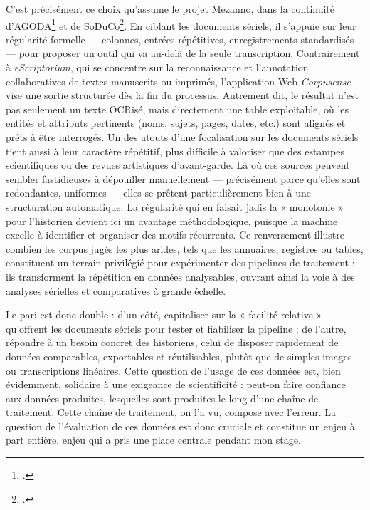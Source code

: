 C’est précisément ce choix qu’assume le projet Mezanno, dans la continuité d’AGODA\footcite[][]{fanny} et de SoDuCo\footcite[][]{soduco}. En ciblant les documents sériels, il s’appuie sur leur régularité formelle — colonnes, entrées répétitives, enregistrements standardisés — pour proposer un outil qui va au-delà de la seule transcription. Contrairement à \emph{eScriptorium}, qui se concentre sur la reconnaissance et l’annotation collaboratives de textes manuscrits ou imprimés, l'application Web \emph{Corpusense} vise une sortie structurée dès la fin du processus. Autrement dit, le résultat n’est pas seulement un texte OCRisé, mais directement une table exploitable, où les entités et attributs pertinents (noms, sujets, pages, dates, etc.) sont alignés et prêts à être interrogés. Un des atouts d’une focalisation sur les documents sériels tient aussi à leur caractère répétitif, plus difficile à valoriser que des estampes scientifiques ou des revues artistiques d'avant-garde. Là où ces sources peuvent sembler fastidieuses à dépouiller manuellement — précisément parce qu’elles sont redondantes, uniformes — elles se prêtent particulièrement bien à une structuration automatique. La régularité qui en faisait jadis la « monotonie » pour l’historien devient ici un avantage méthodologique, puisque la machine excelle à identifier et organiser des motifs récurrents. Ce renversement illustre combien les corpus jugés les plus arides, tels que les annuaires, registres ou tables, constituent un terrain privilégié pour expérimenter des pipelines de traitement : ils transforment la répétition en données analysables, ouvrant ainsi la voie à des analyses sérielles et comparatives à grande échelle.

Le pari est donc double : d’un côté, capitaliser sur la « facilité relative » qu’offrent les documents sériels pour tester et fiabiliser la pipeline ; de l’autre, répondre à un besoin concret des historiens, celui de disposer rapidement de données comparables, exportables et réutilisables, plutôt que de simples images ou transcriptions linéaires. Cette question de l'usage de ces données est, bien évidemment, solidaire à une exigeance de scientificité : peut-on faire confiance aux données produites, lesquelles sont produites le long d'une chaîne de traitement. Cette chaîne de traitement, on l'a vu, compose avec l'erreur. La question de l'évaluation de ces données est donc cruciale et constitue un enjeu à part entière, enjeu qui a pris une place centrale pendant mon stage. 
